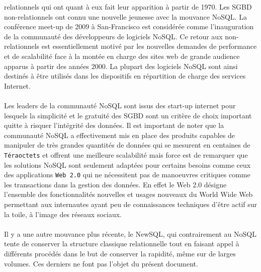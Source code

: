 relationnels qui ont quant à eux fait leur apparition à partir de 1970. Les
\textsf{SGBD} non-relationnels ont connu une nouvelle jeunesse avec la
mouvance \textsf{NoSQL}. La conférence meet-up de 2009
à \textsf{San-Francisco} est considérée comme l'inauguration de la
communauté des développeurs de logiciels \textsf{NoSQL}. Ce retour aux
non-relationnels est essentiellement motivé par les nouvelles demandes
de performance et de scalabilité face à la montée en charge des sites
web de grande audience apparus à partir des années $2000$. La plupart des
logiciels \textsf{NoSQL} sont ainsi destinés à être utilisés dans les
dispositifs en répartition de charge des services \textsf{Internet}.
\\ 
\\ 
Les leaders de la communauté \textsf{NoSQL} sont issus
des \textsf{start-up} internet pour lesquels la simplicité et le
gratuité des \textsf{SGBD} sont un critère de choix important quitte à
risquer l'intégrité des données. Il est important de noter que la
communauté
\textsf{NoSQL} a effectivement mis en place des produits capables de
manipuler de très grandes quantités de données qui se mesurent en
centaines de \texttt{Téraoctets} et offrent une meilleure scalabilité
mais force est de remarquer que les solutions \textsf{NoSQL} sont
seulement adaptées pour certains besoins comme ceux des applications
\texttt{Web 2.0} qui ne nécessitent pas de manoeuvres critiques comme
les transactions dans la gestion des données.  En effet le \textsf{Web
2.0} désigne l'ensemble des fonctionnalités nouvelles et usages
nouveaux du \textsf{World Wide Web} permettant aux internautes ayant
peu de connaissances techniques d’être actif sur la toile, à l’image
des réseaux sociaux.
\\
\\ 
Il y a une autre mouvance plus récente, le
\textsf{NewSQL}, qui contrairement au \textsf{NoSQL}
tente de conserver la structure classique relationnelle tout en
faisant appel à différents procédés dans le but de conserver la
rapidité, même sur de larges volumes\cite{newSQL}. Ces derniers ne
font pas l'objet du présent document.
